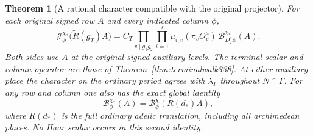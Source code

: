 \documentclass[a4paper,11pt]{article}
\newtheorem{theorem}[proposition]{Theorem}
\theoremstyle{definition}
\theoremstyle{remark}
\numberwithin{equation}{section}
\begin{document}
\begin{theorem}[A rational character compatible with the original projector]\leavevmode\label{thm:rationalperiod342}
For each original signed row $A$ and every indicated column $\phi$,
\[
 \mathcal J^{\chi_*}_\phi\bigl(\widetilde R(g_T)A\bigr)
    = C_T\!\prod_{v\mid g_1g_2}\prod_{i=1}^{s}\mu_{i,v}(\pi_v O_v^a)
                           \,\mathcal B^{\chi_*}_{D_T^s\phi}(A).
\]
Both sides use $A$ at the original signed auxiliary levels. The terminal
scalar and column operator are those of Theorem~\ref{thm:terminalwalk338}.
At either auxiliary place the character on the ordinary period agrees
with $\lambda_\Gamma$ throughout $N\cap\Gamma$. For any row and column
one also has the exact global identity
\[
              \mathcal B^{\chi_*}_\phi(A)
                         =\mathcal B^{\chi}_\phi(R(d_*)A),
\]
where $R(d_*)$ is the full ordinary adelic translation, including
all archimedean places. No Haar scalar occurs in this second identity.
\end{theorem}
\end{document}
